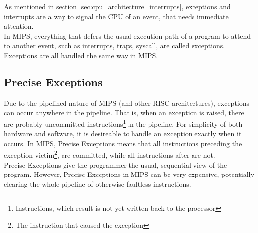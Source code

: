 As mentioned in section \ref{sec:cpu_architecture_interrupts}, exceptions and
interrupts are a way to signal the CPU of an event, that needs immediate
attention.\\
In MIPS, everything that defers the usual execution path of a program to attend to
another event, such as interrupts, traps, syscall, are called exceptions\cite{see_mips_run}.
Exceptions are all handled the same way in MIPS.

\subsection{Precise Exceptions}
Due to the pipelined nature of MIPS (and other RISC architectures), exceptions
can occur anywhere in the pipeline. That is, when an exception is raised, there
are probably uncommitted instructions\footnote{Instructions, which result is not
yet written back to the processor} in the pipeline. For simplicity of both hardware and
software, it is desireable to handle an exception exactly when it occurs. In
MIPS, Precise Exceptions means that all instructions preceding the exception
victim\footnote{The instruction that caused the exception}, are committed, while
all instructions after are not.\\
Precise Exceptions give the programmer the usual, sequential view of the
program. However, Precise Exceptions in MIPS can be very expensive, potentially
clearing the whole pipeline of otherwise faultless instructions.

